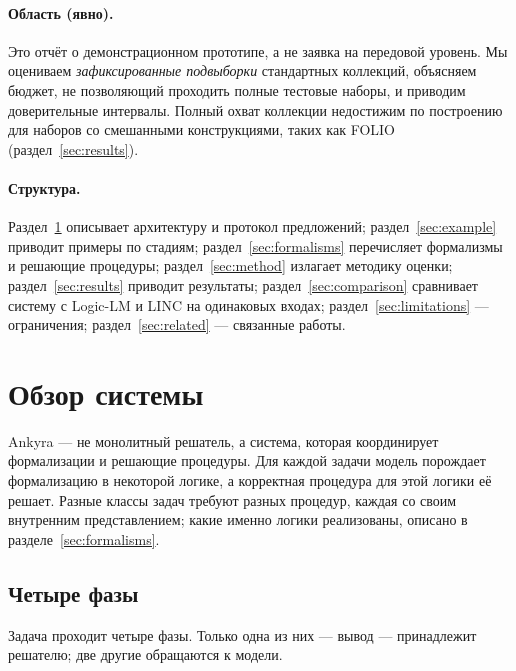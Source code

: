 \documentclass[11pt,a4paper]{article}
\begin{document}
\paragraph{Область (явно).} Это отчёт о демонстрационном прототипе, а не заявка на передовой уровень. Мы оцениваем \emph{зафиксированные подвыборки}
стандартных коллекций, объясняем бюджет, не позволяющий проходить полные тестовые наборы, и приводим доверительные интервалы. Полный охват коллекции
недостижим по построению для наборов со смешанными конструкциями, таких как FOLIO (раздел~\ref{sec:results}).

\paragraph{Структура.} Раздел~\ref{sec:system} описывает архитектуру и протокол предложений; раздел~\ref{sec:example} приводит примеры по стадиям;
раздел~\ref{sec:formalisms} перечисляет формализмы и решающие процедуры; раздел~\ref{sec:method} излагает методику оценки; раздел~\ref{sec:results}
приводит результаты; раздел~\ref{sec:comparison} сравнивает систему с Logic-LM и LINC на одинаковых входах; раздел~\ref{sec:limitations} — ограничения; раздел~\ref{sec:related} — связанные работы.

\section{Обзор системы}
\label{sec:system}

Ankyra — не монолитный решатель, а система, которая координирует формализации и решающие процедуры. Для каждой задачи модель порождает формализацию в
некоторой логике, а корректная процедура для этой логики её решает. Разные классы задач требуют разных процедур, каждая со своим внутренним представлением;
какие именно логики реализованы, описано в разделе~\ref{sec:formalisms}.

\subsection{Четыре фазы}

Задача проходит четыре фазы. Только одна из них — вывод — принадлежит решателю; две другие обращаются к модели.
\end{document}
